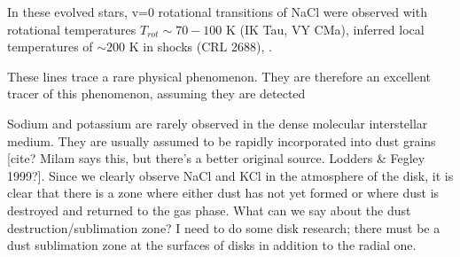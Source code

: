\documentclass[twocolumn]{aastex62}
\begin{document}
In these evolved stars, v=0 rotational transitions of NaCl were observed
with rotational temperatures $T_{rot}\sim70-100$ K (IK Tau, VY CMa), inferred
local temperatures of $\sim200$ K in shocks (CRL 2688), .

These lines trace a rare physical phenomenon.  They are therefore an excellent tracer
of this phenomenon, assuming they are detected

Sodium and potassium are rarely observed in the dense molecular interstellar medium.
They are usually assumed to be rapidly incorporated into dust grains [cite?  Milam
says this, but there's a better original source.  Lodders \& Fegley 1999?].  Since we clearly observe NaCl
and KCl in the atmosphere of the disk, it is clear that there is a zone where either
dust has not yet formed or where dust is destroyed and returned to the gas phase.
{\color{red} What can we say about the dust destruction/sublimation zone?  I need
to do some disk research; there must be a dust sublimation zone at the surfaces
of disks in addition to the radial one.}


\end{document}
